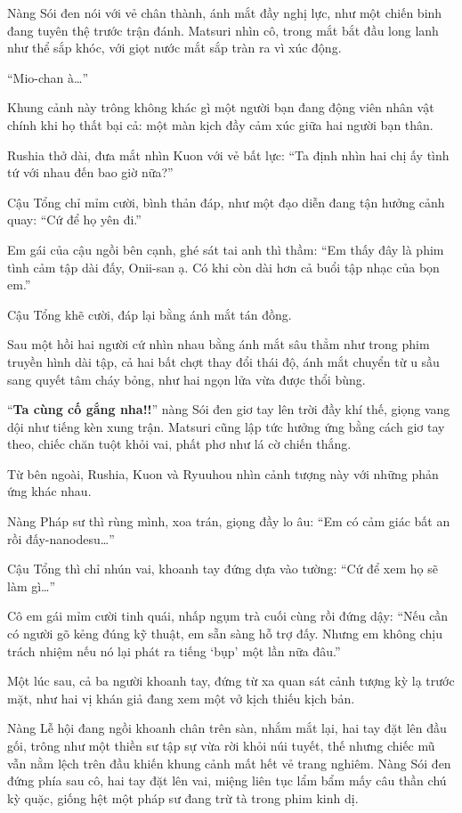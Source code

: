 \documentclass[../main.tex]{subfiles}
\begin{document}
Nàng Sói đen nói với vẻ chân thành, ánh mắt đầy nghị lực, như một chiến binh đang tuyên thệ trước trận đánh. Matsuri nhìn cô, trong mắt bắt đầu long lanh như thể sắp khóc, với giọt nước mắt sắp tràn ra vì xúc động.


``Mio-chan à\dots''

Khung cảnh này trông không khác gì một người bạn đang động viên nhân vật chính khi họ thất bại cả: một màn kịch đầy cảm xúc giữa hai người bạn thân.

Rushia thở dài, đưa mắt nhìn Kuon với vẻ bất lực: ``Ta định nhìn hai chị ấy tình tứ với nhau đến bao giờ nữa?''

Cậu Tổng chỉ mỉm cười, bình thản đáp, như một đạo diễn đang tận hưởng cảnh quay: ``Cứ để họ yên đi.''

Em gái của cậu ngồi bên cạnh, ghé sát tai anh thì thầm: ``Em thấy đây là phim tình cảm tập dài đấy, Onii-san ạ. Có khi còn dài hơn cả buổi tập nhạc của bọn em.''

Cậu Tổng khẽ cười, đáp lại bằng ánh mắt tán đồng.

Sau một hồi hai người cứ nhìn nhau bằng ánh mắt sâu thẳm như trong phim truyền hình dài tập, cả hai bất chợt thay đổi thái độ, ánh mắt chuyển từ u sầu sang quyết tâm cháy bỏng, như hai ngọn lửa vừa được thổi bùng.

``\textbf{Ta cùng cố gắng nha!!}'' nàng Sói đen giơ tay lên trời đầy khí thế, giọng vang dội như tiếng kèn xung trận. Matsuri cũng lập tức hưởng ứng bằng cách giơ tay theo, chiếc chăn tuột khỏi vai, phất phơ như lá cờ chiến thắng.

Từ bên ngoài, Rushia, Kuon và Ryuuhou nhìn cảnh tượng này với những phản ứng khác nhau.

Nàng Pháp sư thì rùng mình, xoa trán, giọng đầy lo âu: ``Em có cảm giác bất an rồi đấy-nanodesu\dots''

Cậu Tổng thì chỉ nhún vai, khoanh tay đứng dựa vào tường: ``Cứ để xem họ sẽ làm gì\dots''

Cô em gái mỉm cười tinh quái, nhấp ngụm trà cuối cùng rồi đứng dậy: ``Nếu cần có người gõ kẻng đúng kỹ thuật, em sẵn sàng hỗ trợ đấy. Nhưng em không chịu trách nhiệm nếu nó lại phát ra tiếng `bụp' một lần nữa đâu.''

\ct

Một lúc sau, cả ba người khoanh tay, đứng từ xa quan sát cảnh tượng kỳ lạ trước mặt, như hai vị khán giả đang xem một vở kịch thiếu kịch bản.

Nàng Lễ hội đang ngồi khoanh chân trên sàn, nhắm mắt lại, hai tay đặt lên đầu gối, trông như một thiền sư tập sự vừa rời khỏi núi tuyết, thế nhưng chiếc mũ vẫn nằm lệch trên đầu khiến khung cảnh mất hết vẻ trang nghiêm. Nàng Sói đen đứng phía sau cô, hai tay đặt lên vai, miệng liên tục lẩm bẩm mấy câu thần chú kỳ quặc, giống hệt một pháp sư đang trừ tà trong phim kinh dị.
\end{document}

